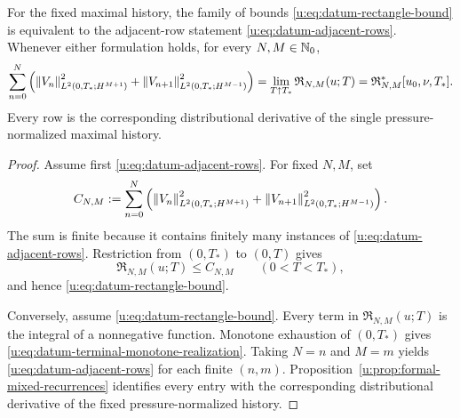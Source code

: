 \begin{proposition}
\label{u:prop:datum-terminal-realization}

For the fixed maximal history, the family of bounds
\eqref{u:eq:datum-rectangle-bound} is equivalent to the adjacent-row statement
\eqref{u:eq:datum-adjacent-rows}.  Whenever either formulation holds, for every
\(N,M\in\mathbb N_0\),
\begin{equation}
 \sum_{n=0}^{N}\left(
 \left\lVert V_n\right\rVert_{L^2(0,T_*;H^{M+1})}^2
 +\left\lVert V_{n+1}\right\rVert_{L^2(0,T_*;H^{M-1})}^2
 \right)
 =\lim_{T\uparrow T_*}\mathfrak R_{N,M}(u;T)
 =\mathfrak R_{N,M}^*[u_0,\nu,T_*].
 \label{u:eq:datum-terminal-monotone-realization}
\end{equation}
Every row is the corresponding distributional derivative of the single
pressure-normalized maximal history.
\end{proposition}

\begin{proof}
Assume first \eqref{u:eq:datum-adjacent-rows}.  For fixed \(N,M\), set
\[
 C_{N,M}:=
 \sum_{n=0}^{N}\left(
  \left\lVert V_n\right\rVert_{L^2(0,T_*;H^{M+1})}^2
  +\left\lVert V_{n+1}\right\rVert_{L^2(0,T_*;H^{M-1})}^2
 \right).
\]
The sum is finite because it contains finitely many instances of
\eqref{u:eq:datum-adjacent-rows}.  Restriction from \((0,T_*)\) to \((0,T)\)
gives
\[
 \mathfrak R_{N,M}(u;T)\le C_{N,M}
 \qquad(0<T<T_*),
\]
and hence \eqref{u:eq:datum-rectangle-bound}.

Conversely, assume \eqref{u:eq:datum-rectangle-bound}.  Every term in
\(\mathfrak R_{N,M}(u;T)\) is the integral of a nonnegative function.
Monotone exhaustion of \((0,T_*)\) gives
\eqref{u:eq:datum-terminal-monotone-realization}.  Taking \(N=n\) and \(M=m\)
yields \eqref{u:eq:datum-adjacent-rows} for each finite \((n,m)\).
Proposition~\ref{u:prop:formal-mixed-recurrences} identifies every entry with
the corresponding distributional derivative of the fixed pressure-normalized
history.
\end{proof}

